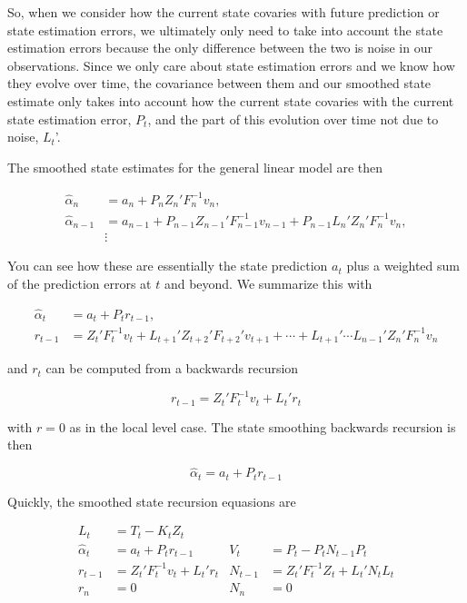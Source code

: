 \documentclass{tufte-book}
\begin{document}
So, when we consider how the current state covaries with future prediction or state estimation errors, we ultimately only need to take into account the state estimation errors because the only difference between the two is noise in our observations. Since we only care about state estimation errors and we know how they evolve over time, the covariance between them and our smoothed state estimate only takes into account how the current state covaries with the current state estimation error, $P_t$, and the part of this evolution over time not due to noise, $L_t$'.

The smoothed state estimates for the general linear model are then

\begin{align*}
\hat{\alpha}_n &= a_n + P_n Z_n' F_n^{-1} v_n, \\
\hat{\alpha}_{n-1} &= a_{n-1} + P_{n-1} Z_{n-1}' F_{n-1}^{-1} v_{n-1} + P_{n-1} L_n' Z_n' F_n^{-1} v_n, \\
&\vdots
\end{align*}

\noindent You can see how these are essentially the state prediction $a_t$ plus a weighted sum of the prediction errors at $t$ and beyond. We summarize this with

\begin{align*}
\hat{\alpha}_t &= a_t + P_t r_{t-1},\\
r_{t-1} &= Z_t' F_t^{-1} v_t + L_{t+1}' Z_{t+2}' F_{t+2}' v_{t+1} + \cdots + L_{t+1}' \cdots L_{n-1}' Z_n' F_n^{-1} v_n
\end{align*}

\noindent and $r_t$ can be computed from a backwards recursion

\[
r_{t-1} = Z_t' F_t^{-1} v_t + L_t' r_t
\]

\noindent with $r=0$ as in the local level case. The state smoothing backwards recursion is then

\[
\hat{\alpha}_t = a_t + P_t r_{t-1}
\]

Quickly, the smoothed state recursion equasions are 

\begin{align*}
L_t &= T_t - K_t Z_t \\
\hat{\alpha}_t &= a_t + P_t r_{t-1} & V_t &= P_t - P_t N_{t-1} P_t \\
r_{t-1} &= Z_t' F_t^{-1} v_t + L_t' r_t & N_{t-1} &= Z_t' F_t^{-1} Z_t + L_t' N_t L_t \\
r_n &= 0 & N_n &= 0
\end{align*}
\end{document}
